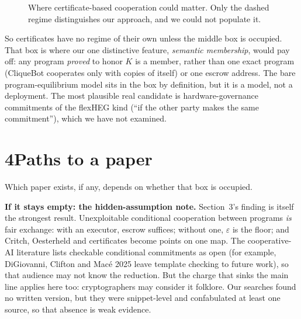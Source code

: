 \documentclass[11pt]{article}
\begin{document}
\begin{figure}[h]
\centering
{}
\caption{Where certificate-based cooperation could matter. Only the dashed regime distinguishes our approach, and we could not populate it.}
\label{fig:executor}
\end{figure}

So certificates have no regime of their own unless the middle box is occupied. That box is where our one distinctive feature, \emph{semantic membership}, would pay off: any program \emph{proved} to honor $K$ is a member, rather than one exact program (CliqueBot cooperates only with copies of itself) or one escrow address. The bare program-equilibrium model sits in the box by definition, but it is a model, not a deployment. The most plausible real candidate is hardware-governance commitments of the flexHEG kind (``if the other party makes the same commitment''), which we have not examined.

\section*{4\quad Paths to a paper}

Which paper exists, if any, depends on whether that box is occupied.

\textbf{If it stays empty: the hidden-assumption note.} Section~3's finding is itself the strongest result. Unexploitable conditional cooperation between programs \emph{is} fair exchange: with an executor, escrow suffices; without one, $\varepsilon$ is the floor; and Critch, Oesterheld and certificates become points on one map. The cooperative-AI literature lists checkable conditional commitments as open (for example, DiGiovanni, Clifton and Macé 2025 leave template checking to future work), so that audience may not know the reduction. But the charge that sinks the main line applies here too: cryptographers may consider it folklore. Our searches found no written version, but they were snippet-level and confabulated at least one source, so that absence is weak evidence.
\end{document}
